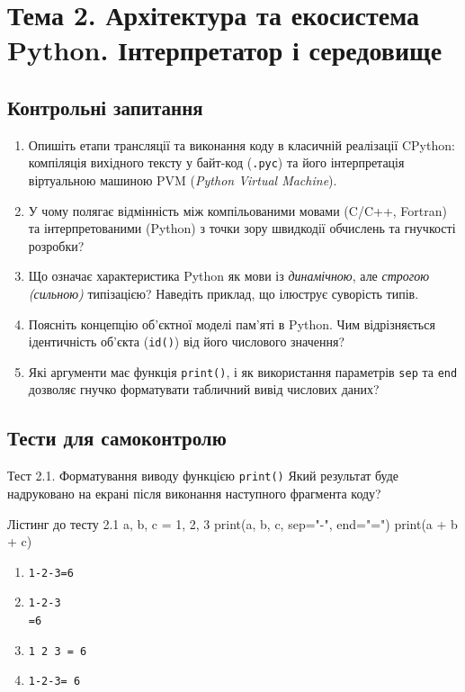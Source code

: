 \section{Тема 2. Архітектура та екосистема Python. Інтерпретатор і середовище}

\subsection*{Контрольні запитання}
\begin{enumerate}[label=\textbf{2.\arabic*.}]
	\item Опишіть етапи трансляції та виконання коду в класичній реалізації CPython: компіляція вихідного тексту у байт-код (\texttt{.pyc}) та його інтерпретація віртуальною машиною PVM (\textit{Python Virtual Machine}).
	\item У чому полягає відмінність між компільованими мовами (C/C++, Fortran) та інтерпретованими (Python) з точки зору швидкодії обчислень та гнучкості розробки?
	\item Що означає характеристика Python як мови із \textit{динамічною}, але \textit{строгою (сильною)} типізацією? Наведіть приклад, що ілюструє суворість типів.
	\item Поясніть концепцію об'єктної моделі пам'яті в Python. Чим відрізняється ідентичність об'єкта (\texttt{id()}) від його числового значення?
	\item Які аргументи має функція \texttt{print()}, і як використання параметрів \texttt{sep} та \texttt{end} дозволяє гнучко форматувати табличний вивід числових даних?
\end{enumerate}

\subsection*{Тести для самоконтролю}

\begin{pr}{Тест 2.1. Форматування виводу функцією \texttt{print()}}
Який результат буде надруковано на екрані після виконання наступного фрагмента коду?
\begin{py}{Лістинг до тесту 2.1}
a, b, c = 1, 2, 3
print(a, b, c, sep="-", end="=")
print(a + b + c)
\end{py}
\begin{enumerate}[label=\textbf{\Alph*.}]
	\item \texttt{1-2-3=6}
	\item \texttt{1-2-3} \\ \texttt{=6}
	\item \texttt{1 2 3 = 6}
	\item \texttt{1-2-3= 6}
\end{enumerate}
\end{pr}

